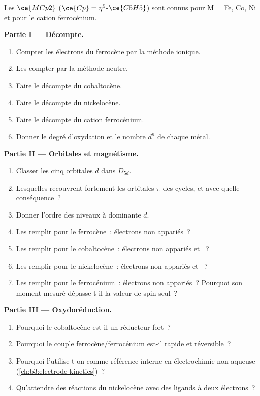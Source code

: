 \begin{problem}
\label{pb:b3:organometallic-bonding:1}
Les  $\ce{MCp2}$ ($\ce{Cp} = \eta^5$-$\ce{C5H5}$) sont connus pour M = Fe, Co, Ni et pour le cation ferrocénium.

\medskip\noindent\textbf{Partie I --- Décompte.}
\begin{enumerate}
  \item Compter les électrons du ferrocène par la méthode ionique.
  \item Les compter par la méthode neutre.
  \item Faire le décompte du cobaltocène.
  \item Faire le décompte du nickelocène.
  \item Faire le décompte du cation ferrocénium.
  \item Donner le degré d'oxydation et le nombre $d^n$ de chaque métal.
\end{enumerate}

\medskip\noindent\textbf{Partie II --- Orbitales et magnétisme.}
\begin{enumerate}[resume]
  \item Classer les cinq orbitales $d$ dans $D_{5d}$.
  \item Lesquelles recouvrent fortement les orbitales $\pi$ des cycles, et
        avec quelle conséquence~?
  \item Donner l'ordre des niveaux à dominante $d$.
  \item Les remplir pour le ferrocène~: électrons non appariés~?
  \item Les remplir pour le cobaltocène~: électrons non appariés et ~?
  \item Les remplir pour le nickelocène~: électrons non appariés et ~?
  \item Les remplir pour le ferrocénium~: électrons non appariés~? Pourquoi
        son moment mesuré dépasse-t-il la valeur de spin seul~?
\end{enumerate}

\medskip\noindent\textbf{Partie III --- Oxydoréduction.}
\begin{enumerate}[resume]
  \item Pourquoi le cobaltocène est-il un réducteur fort~?
  \item Pourquoi le couple ferrocène/ferrocénium est-il rapide et
        réversible~?
  \item Pourquoi l'utilise-t-on comme référence interne en électrochimie
        non aqueuse (\cref{ch:b3:electrode-kinetics})~?
  \item Qu'attendre des réactions du nickelocène avec des ligands à deux
        électrons~?
\end{enumerate}


\end{problem}
